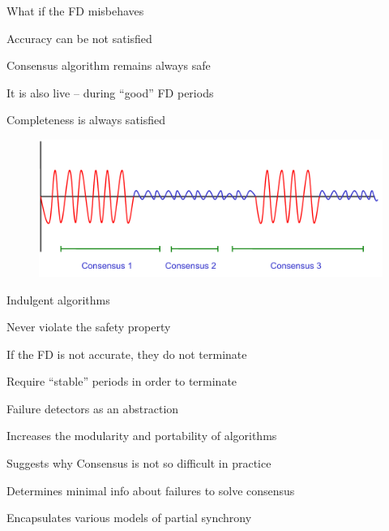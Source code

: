 \begin{frame}{What if the FD misbehaves}

\BIL
\item Accuracy can be not satisfied
\BI 
\item Consensus algorithm remains always safe
\item It is also live -- during “good” FD periods
\EI
\item Completeness is always satisfied
\EIL
	
\begin{figure}
	\includegraphics[width=\textwidth]{goodbadtimes}
\end{figure}

\end{frame}

\begin{frame}{Indulgent algorithms}

\begin{definition}
\BI
\item Never violate the safety property
\item If the FD is not accurate, they do not terminate
\item Require “stable” periods in order to terminate
\EI
\end{definition}

\bigskip
{}

\bigskip
\begin{Bib}
\BI
\item {}
\EI
\end{Bib}

\end{frame}


\begin{frame}{Failure detectors as an abstraction}


\BIL
\item Increases the modularity and portability of algorithms
\item Suggests why Consensus is not so difficult in practice
\item Determines minimal info about failures to solve consensus
\item Encapsulates various models of partial synchrony
\EIL

\end{frame}

